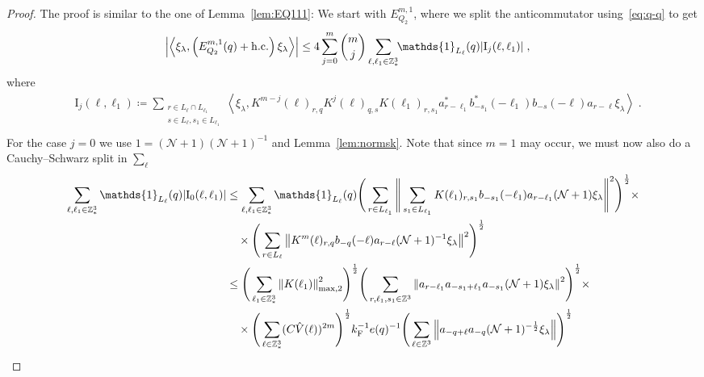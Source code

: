 \documentclass[12pt,a4paper]{article}
\numberwithin{equation}{section}
\newcommand{\1}{\mathbb{I}}
\newcommand{\F}{\mathrm{F}}
\newcommand{\I}{\mathrm{I}}
\newcommand{\Z}{\mathbb{Z}}
\newcommand{\NN}{\mathcal{N}}
\newcommand{\half}{\frac{1}{2}}
\newcommand{\eva}[1]{\left\langle #1 \right\rangle}
\theoremstyle{plain}
\theoremstyle{definition}
\theoremstyle{remark}
\theoremstyle{plain}
\theoremstyle{definition}
\theoremstyle{remark}
\begin{document}
\begin{proof}
The proof is similar to the one of Lemma~\ref{lem:EQ111}: We start with $ E^{m,1}_{Q_2} $, where we split the anticommutator using~\eqref{eq:q-q} to get
\begin{equation} \label{eq:EQ2111}
\begin{aligned}
	& \abs{\eva{\xi_\lambda,\left(E^{m,1}_{Q_2}(q) + \mathrm{h.c.}\right) \xi_\lambda }}
	\le 4 \sum_{j=0}^m {{m}\choose j} \sum_{\ell,\ell_1 \in \Z^3_*}\!\! \mathds{1}_{L_\ell}(q) |\I_j(\ell, \ell_1)| \;,
	\end{aligned}
\end{equation}
where
\begin{equation}
\begin{aligned}
	& \I_j(\ell, \ell_1)
	\coloneq \sum_{\substack{r\in L_{\ell} \cap L_{\ell_1}\\ s \in L_{\ell},s_1\in L_{\ell_1}}}
		\eva{\xi_\lambda, K^{m-j}(\ell)_{r,q} K^{j}(\ell)_{q,s} K(\ell_1)_{r,s_1} a^*_{r-\ell_1} b^*_{-s_1}(-\ell_1) b_{-s}(-\ell) a_{r-\ell} \xi_\lambda} \;. \\
\end{aligned}
\end{equation}
For the case $ j = 0 $ we use $1 = (\NN+1) (\NN+1)^{-1}$ and Lemma~\ref{lem:normsk}. Note that since $ m = 1 $ may occur, we must now also do a Cauchy--Schwarz split in $ \sum_\ell $
\begin{align}
	\sum_{\ell,\ell_1 \in \Z^3_*} \mathds{1}_{L_\ell}(q) |\I_0(\ell, \ell_1)|
 	&\leq \sum\limits_{\ell,\ell_1 \in \Z^3_*} \mathds{1}_{L_\ell}(q) \Bigg( \sum\limits_{r \in L_{\ell_1}} 
 		\Bigg\Vert \sum\limits_{s_1 \in L_{\ell_1}} K(\ell_1)_{r,s_1} b_{-s_1}(-\ell_1) a_{r-\ell_1} (\NN+1) \xi_\lambda \Bigg\Vert^2\Bigg)^\half \times\nonumber\\
 	&\quad \times \Bigg( \sum\limits_{r \in L_\ell} \norm{K^{m}(\ell)_{r,q} b_{-q}(-\ell) a_{r-\ell} (\NN+1)^{-1}\xi_\lambda }^2\Bigg)^\half \nonumber\\
 	&\leq \Bigg( \sum\limits_{\ell_1 \in \Z^3_*} \norm{K(\ell_1)}_{\mathrm{max,2}}^2 \Bigg)^{\half} \Bigg(
 		\sum\limits_{r, \ell_1, s_1 \in \Z^3} \norm{a_{r-\ell_1} a_{-s_1+\ell_1} a_{-s_1} (\NN+1) \xi_\lambda}^2\Bigg)^\half \times\nonumber\\
 	&\quad \times \Bigg( \sum\limits_{\ell \in \Z^3_*}(C \hat{V}(\ell))^{2m} \Bigg)^{\half}
 		k_{\F}^{-1} e(q)^{-1}
 		\Bigg( \sum\limits_{\ell \in \Z^3} \norm{a_{-q + \ell} a_{-q} (\NN+1)^{-\half} \xi_\lambda } \Bigg)^{\half} \nonumber\\

\end{align}
\end{proof}
\end{document}
